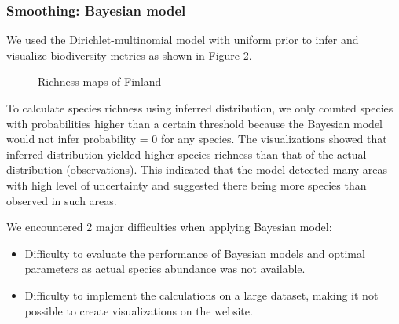 \documentclass{article}
\begin{document}
\subsubsection{Smoothing: Bayesian model}
We used the Dirichlet-multinomial model with uniform prior to infer and visualize biodiversity metrics as shown in Figure 2. 
\par
\begin{figure}[h]
	\vspace*{-3mm}
	\centering
	\caption{Richness maps of Finland}
	\vspace*{-1mm}
\end{figure}
\noindent
To calculate species richness using inferred distribution, we only counted species with probabilities higher than a certain threshold because the Bayesian model would not infer probability = 0 for any species. The visualizations showed that inferred distribution yielded higher species richness than that of the actual distribution (observations). This indicated that the model detected many areas with high level of uncertainty and suggested there being more species than observed in such areas.
\par
We encountered 2 major difficulties when applying Bayesian model:
\begin{itemize}
	\vspace*{-1mm}
	\setlength\itemsep{1mm}
	\item Difficulty to evaluate the performance of Bayesian models and optimal parameters as actual species abundance was not available.
	\item Difficulty to implement the calculations on a large dataset, making it not possible to create visualizations on the website.
\end{itemize}
\end{document}
